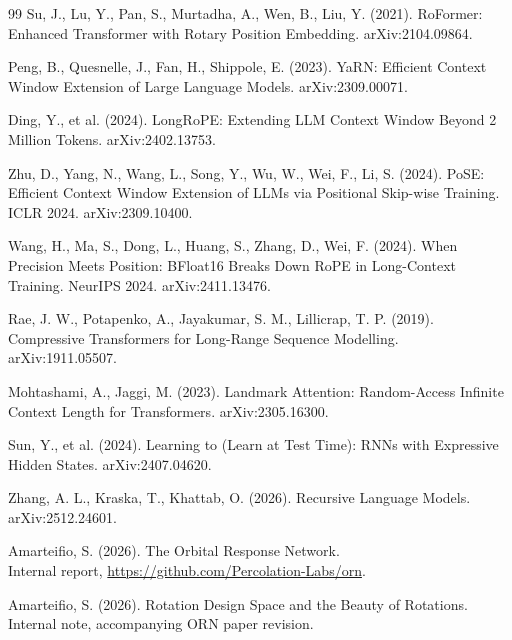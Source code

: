 \documentclass[10pt, twocolumn, a4paper]{article}
\begin{document}
\begin{thebibliography}{99}
Su, J., Lu, Y., Pan, S., Murtadha, A., Wen, B., Liu, Y. (2021). RoFormer: Enhanced Transformer with Rotary Position Embedding. arXiv:2104.09864.

Peng, B., Quesnelle, J., Fan, H., Shippole, E. (2023). YaRN: Efficient Context Window Extension of Large Language Models. arXiv:2309.00071.

Ding, Y., et al. (2024). LongRoPE: Extending LLM Context Window Beyond 2 Million Tokens. arXiv:2402.13753.

Zhu, D., Yang, N., Wang, L., Song, Y., Wu, W., Wei, F., Li, S. (2024). PoSE: Efficient Context Window Extension of LLMs via Positional Skip-wise Training. ICLR 2024. arXiv:2309.10400.

Wang, H., Ma, S., Dong, L., Huang, S., Zhang, D., Wei, F. (2024). When Precision Meets Position: BFloat16 Breaks Down RoPE in Long-Context Training. NeurIPS 2024. arXiv:2411.13476.

Rae, J. W., Potapenko, A., Jayakumar, S. M., Lillicrap, T. P. (2019). Compressive Transformers for Long-Range Sequence Modelling. arXiv:1911.05507.

Mohtashami, A., Jaggi, M. (2023). Landmark Attention: Random-Access Infinite Context Length for Transformers. arXiv:2305.16300.

Sun, Y., et al. (2024). Learning to (Learn at Test Time): RNNs with Expressive Hidden States. arXiv:2407.04620.

Zhang, A. L., Kraska, T., Khattab, O. (2026). Recursive Language Models. arXiv:2512.24601.

Amarteifio, S. (2026). The Orbital Response Network. \\Internal report, \url{https://github.com/Percolation-Labs/orn}.

Amarteifio, S. (2026). Rotation Design Space and the Beauty of Rotations. Internal note, accompanying ORN paper revision.

\end{thebibliography}
\end{document}
